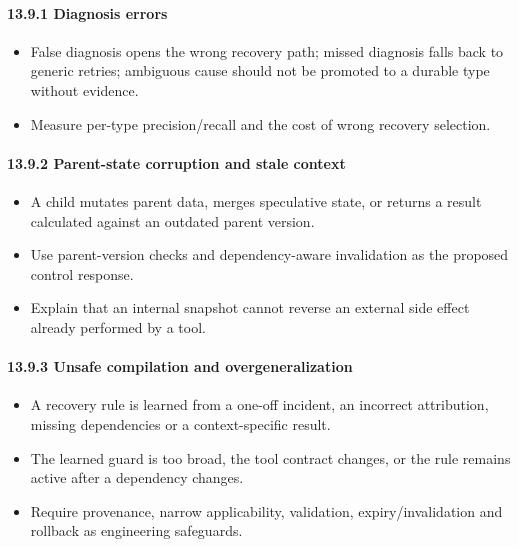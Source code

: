 \paragraph{13.9.1 Diagnosis errors}\label{1391-diagnosis-errors}

\begin{itemize}
\tightlist
\item
  False diagnosis opens the wrong recovery path; missed diagnosis falls back to generic retries; ambiguous cause should not be promoted to a durable type without evidence.
\item
  Measure per-type precision/recall and the cost of wrong recovery selection.
\end{itemize}

\paragraph{13.9.2 Parent-state corruption and stale context}\label{1392-parent-state-corruption-and-stale-context}

\begin{itemize}
\tightlist
\item
  A child mutates parent data, merges speculative state, or returns a result calculated against an outdated parent version.
\item
  Use parent-version checks and dependency-aware invalidation as the proposed control response.
\item
  Explain that an internal snapshot cannot reverse an external side effect already performed by a tool.
\end{itemize}

\paragraph{13.9.3 Unsafe compilation and overgeneralization}\label{1393-unsafe-compilation-and-overgeneralization}

\begin{itemize}
\tightlist
\item
  A recovery rule is learned from a one-off incident, an incorrect attribution, missing dependencies or a context-specific result.
\item
  The learned guard is too broad, the tool contract changes, or the rule remains active after a dependency changes.
\item
  Require provenance, narrow applicability, validation, expiry/invalidation and rollback as engineering safeguards.
\end{itemize}


